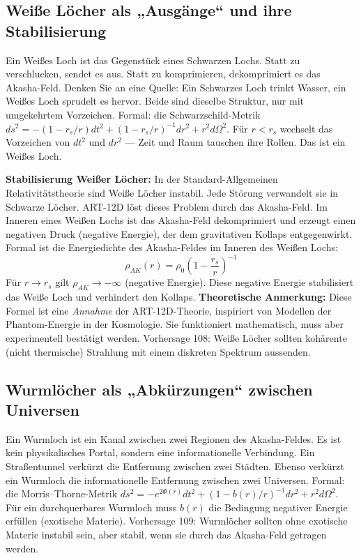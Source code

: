 \documentclass[11pt,a4paper]{article}
\begin{document}
\subsection{Weiße Löcher als „Ausgänge`` und ihre Stabilisierung}
Ein Weißes Loch ist das Gegenstück eines Schwarzen Lochs. Statt zu verschlucken, sendet es aus. Statt zu komprimieren, dekomprimiert es das Akasha-Feld. Denken Sie an eine Quelle: Ein Schwarzes Loch trinkt Wasser, ein Weißes Loch sprudelt es hervor. Beide sind dieselbe Struktur, nur mit umgekehrtem Vorzeichen. Formal: die Schwarzschild-Metrik $ds^2 = -(1-r_s/r)dt^2 + (1-r_s/r)^{-1}dr^2 + r^2 d\Omega^2$. Für $r < r_s$ wechselt das Vorzeichen von $dt^2$ und $dr^2$ --- Zeit und Raum tauschen ihre Rollen. Das ist ein Weißes Loch.

\textbf{Stabilisierung Weißer Löcher:} In der Standard-Allgemeinen Relativitätstheorie sind Weiße Löcher instabil. Jede Störung verwandelt sie in Schwarze Löcher. ART-12D löst dieses Problem durch das Akasha-Feld. Im Inneren eines Weißen Lochs ist das Akasha-Feld dekomprimiert und erzeugt einen negativen Druck (negative Energie), der dem gravitativen Kollaps entgegenwirkt. Formal ist die Energiedichte des Akasha-Feldes im Inneren des Weißen Lochs:
\begin{equation}
\rho_{AK}(r) = \rho_0 \left(1 - \frac{r_s}{r}\right)^{-1}
\end{equation}
Für $r \to r_s$ gilt $\rho_{AK} \to -\infty$ (negative Energie). Diese negative Energie stabilisiert das Weiße Loch und verhindert den Kollaps. \textbf{Theoretische Anmerkung:} Diese Formel ist eine \textit{Annahme} der ART-12D-Theorie, inspiriert von Modellen der Phantom-Energie in der Kosmologie. Sie funktioniert mathematisch, muss aber experimentell bestätigt werden. Vorhersage 108: Weiße Löcher sollten kohärente (nicht thermische) Strahlung mit einem diskreten Spektrum aussenden.

\subsection{Wurmlöcher als „Abkürzungen`` zwischen Universen}
Ein Wurmloch ist ein Kanal zwischen zwei Regionen des Akasha-Feldes. Es ist kein physikalisches Portal, sondern eine informationelle Verbindung. Ein Straßentunnel verkürzt die Entfernung zwischen zwei Städten. Ebenso verkürzt ein Wurmloch die informationelle Entfernung zwischen zwei Universen. Formal: die Morris--Thorne-Metrik $ds^2 = -e^{2\Phi(r)}dt^2 + (1-b(r)/r)^{-1}dr^2 + r^2 d\Omega^2$. Für ein durchquerbares Wurmloch muss $b(r)$ die Bedingung negativer Energie erfüllen (exotische Materie). Vorhersage 109: Wurmlöcher sollten ohne exotische Materie instabil sein, aber stabil, wenn sie durch das Akasha-Feld getragen werden.
\end{document}
